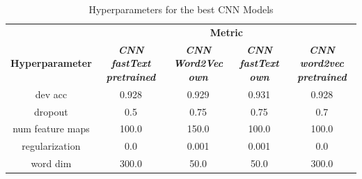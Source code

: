 \documentclass[conference]{IEEEtran}
\begin{document}
\begin{table}[htbp]
\caption{Hyperparameters for the best CNN Models}
\begin{center}
\begin{tabular}{|c|c|c|c|c|}
\hline
\textbf{}&\multicolumn{4}{|c|}{\textbf{Metric}} \\ 
\cline{2-5}
\textbf{Hyperparameter} & \textbf{\textit{CNN fastText pretrained}}& \textbf{\textit{CNN Word2Vec own}}& \textbf{\textit{CNN fastText own}}& \textbf{\textit{CNN word2vec pretrained}} \\ 
\hline
dev acc & 0.928 & 0.929 & 0.931 & 0.928 \\ 
\hline
dropout & 0.5 & 0.75 & 0.75 & 0.7 \\ 
\hline
num feature maps & 100.0 & 150.0 & 100.0 & 100.0 \\ 
\hline
regularization & 0.0 & 0.001 & 0.001 & 0.0 \\ 
\hline
word dim & 300.0 & 50.0 & 50.0 & 300.0 \\ 
\hline
\end{tabular}
\label{taba4}
\end{center}
\end{table}
\end{document}
